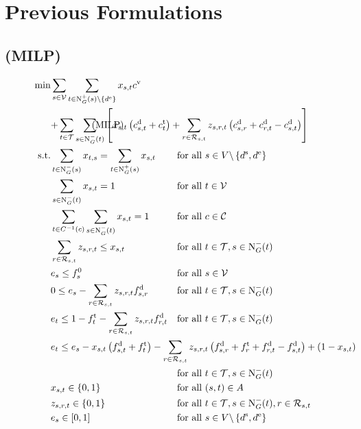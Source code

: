\chapter{Previous Formulations}

\section{(MILP)}

\begin{align}
	\min & \sum_{s\in\mathcal{V}} \sum_{t\in\Nout(s)\backslash\{d^{\operatorname{e}}\}} x_{s,t}\cv \nonumber \\
	& \omit\rlap{$\displaystyle{ + \sum_{t\in\mathcal{T}} \sum_{s\in\Nin(t)} \left[x_{s,t}\left(\cd_{s,t}+\ct_{t}\right) + \sum_{r\in\Rst} z_{s,r,t}\left(\cd_{s,r}+\cd_{r,t}-\cd_{s,t}\right)\right]}$} \tag{MILP} \label{eq:MILP} \\
	\text{s.t.} & \sum_{t\in\Nin(s)} x_{t,s} = \sum_{t\in\Nout(s)} x_{s,t} & & \text{for all } s\in V\backslash\left\{d^{\operatorname{s}},d^{\operatorname{e}}\right\} \label{eq:MILP:flow} \\
	& \sum_{s\in\Nin(t)} x_{s,t} = 1 & & \text{for all } t\in\mathcal{V} \label{eq:MILP:vehicles} \\
	& \sum_{t\in C^{-1}(c)} \sum_{s\in\Nin(t)} x_{s,t} = 1 & & \text{for all } c\in\mathcal{C} \label{eq:MILP:costumer} \\
	& \sum_{r\in\Rst} z_{s,r,t} \leq x_{s,t} & & \text{for all } t\in\mathcal{T}, s\in\Nin(t) \label{eq:MILP:refuel} \\
	& e_s \leq f_s^0 & & \text{for all } s\in\mathcal{V} \label{eq:MILP:initial_fuel} \\
	& 0 \leq e_s - \sum_{r\in\Rst} z_{s,r,t}\fd_{s,r} & & \text{for all } t\in\mathcal{T}, s\in\Nin(t) \label{eq:MILP:min_fuel} \\
	& e_t \leq 1 - \ft_t - \sum_{r\in\Rst} z_{s,r,t}\fd_{r,t} & & \text{for all } t\in\mathcal{T}, s\in\Nin(t) \label{eq:MILP:max_fuel} \\
	& \omit\rlap{$\displaystyle{e_t \leq e_s - x_{s,t}\left(f_{s,t}^{\operatorname{d}}+f_t^{\operatorname{t}}\right) - \sum_{r\in\Rst} z_{s,r,t}\left(\fd_{s,r}+\ft_r+\fd_{r,t}-\fd_{s,t}\right) + \left(1-x_{s,t}\right)}$} \nonumber \\
	& & & \text{for all } t\in\mathcal{T}, s\in\Nin(t) \label{eq:MILP:fuel_consumption} \\
	& x_{s,t}\in\{0,1\} & & \text{for all } (s,t)\in A \label{eq:MILP:xst} \\
	& z_{s,r,t}\in\{0,1\} & & \text{for all } t\in\mathcal{T},s\in\Nin(t),r\in\Rst \label{eq:MILP:zsrt} \\
	& e_s\in[0,1] & & \text{for all } s\in V\backslash\left\{d^{\operatorname{s}},d^{\operatorname{e}}\right\} \label{eq:MILP:es}
\end{align}

